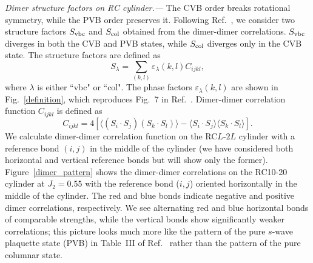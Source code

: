 \documentclass[prl,aps,epsf,showpacs,twocolumn]{revtex4}
\begin{document}
\begin{appendices}
\textit{Dimer structure factors on RC cylinder.---} The CVB order breaks rotational symmetry, while the PVB order preserves it.  Following Ref.~\cite{PRB_74_144422}, we consider two structure factors $S_{\rm vbc}$ and $S_{\rm col}$ obtained from the dimer-dimer correlations. $S_{\rm vbc}$ diverges in both the CVB and PVB states, while $S_{\rm col}$ diverges only in the CVB state.  The structure factors are defined as
\begin{equation}
S_{\lambda} = \sum_{(k,l)}\varepsilon_{\lambda}(k,l)C_{ijkl}, \label{dimer_stru}
\end{equation}
where $\lambda$ is either ``vbc" or ``col". The phase factors $\varepsilon_{\lambda}(k,l)$ are shown in Fig.~\ref{definition}, which reproduces Fig.~7 in Ref.~\cite{PRB_74_144422}. Dimer-dimer correlation function $C_{ijkl}$ is defined as
\begin{equation}
C_{ijkl} = 4\left[\langle (S_i \cdot S_j)(S_k \cdot S_l)\rangle - \langle S_i \cdot S_j\rangle\langle S_k \cdot S_l\rangle \right].
\end{equation}
We calculate dimer-dimer correlation function on the RC$L$-$2L$ cylinder with a reference bond $(i,j)$ in the middle of the cylinder (we have considered both horizontal and vertical reference bonds but will show only the former).  Figure~\ref{dimer_pattern} shows the dimer-dimer correlations on the RC10-20 cylinder at $J_2 = 0.55$ with the reference bond ($i,j$) oriented horizontally in the middle of the cylinder.  The red and blue bonds indicate negative and positive dimer correlations, respectively.  We see alternating red and blue horizontal bonds of comparable strengths, while the vertical bonds show significantly weaker correlations; this picture looks much more like the pattern of the pure $s$-wave plaquette state (PVB) in Table~III of Ref.~\cite{PRB_74_144422} rather than the pattern of the pure columnar state.



\end{appendices}
\end{document}
